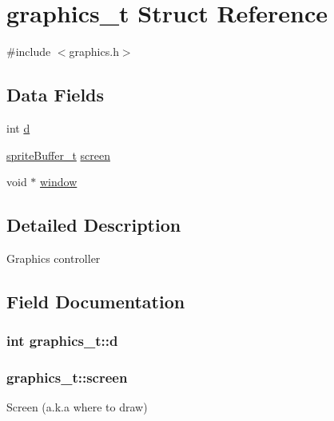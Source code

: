 \hypertarget{structgraphics__t}{}\section{graphics\+\_\+t Struct Reference}
\label{structgraphics__t}


{\ttfamily \#include $<$graphics.\+h$>$}

\subsection*{Data Fields}
\begin{DoxyCompactItemize}
\item 
int \hyperlink{structgraphics__t_ad199c9ece35a3a64263ee6b64749bb5b}{d}
\item 
\hyperlink{structsprite_buffer__t}{sprite\+Buffer\+\_\+t} \hyperlink{structgraphics__t_a165959217e2643b80a710eee4212f563}{screen}
\item 
void $\ast$ \hyperlink{structgraphics__t_a2481cd19286678d56f33570ae34e406f}{window}
\end{DoxyCompactItemize}


\subsection{Detailed Description}
Graphics controller 

\subsection{Field Documentation}
\subsubsection[{\texorpdfstring{d}{d}}]{\setlength{\rightskip}{0pt plus 5cm}int graphics\+\_\+t\+::d}\hypertarget{structgraphics__t_ad199c9ece35a3a64263ee6b64749bb5b}{}\label{structgraphics__t_ad199c9ece35a3a64263ee6b64749bb5b}
\subsubsection[{\texorpdfstring{screen}{screen}}]{ graphics\+\_\+t\+::screen}\hypertarget{structgraphics__t_a165959217e2643b80a710eee4212f563}{}\label{structgraphics__t_a165959217e2643b80a710eee4212f563}
Screen (a.\+k.\+a where to draw) 
